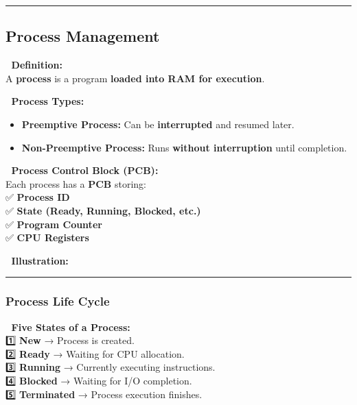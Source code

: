 \documentclass[
]{article}
\makeatletter
\newcommand*\pandocbounded[1]{%
  \sbox\pandoc@box{#1}%
  \Gscale@div\@tempa{\textheight}{\dimexpr\ht\pandoc@box+\dp\pandoc@box\relax}%
  \Gscale@div\@tempb{\linewidth}{\wd\pandoc@box}%
  \ifdim\@tempb\p@<\@tempa\p@\let\@tempa\@tempb\fi%
  \ifdim\@tempa\p@<\p@\scalebox{\@tempa}{\usebox\pandoc@box}%
  \else\usebox{\pandoc@box}%
  \fi%
}
\providecommand{\tightlist}{%
  \setlength{\itemsep}{0pt}\setlength{\parskip}{0pt}}
\makeatother
\begin{document}
\begin{center}\rule{0.5\linewidth}{0.5pt}\end{center}

\subsection{\texorpdfstring{\textbf{Process
Management}}{Process Management}}\label{process-management}

📌 \textbf{Definition:}\\
A \textbf{process} is a program \textbf{loaded into RAM for execution}.

📌 \textbf{Process Types:}

\begin{itemize}
\tightlist
\item
  \textbf{Preemptive Process:} Can be \textbf{interrupted} and resumed
  later.
\item
  \textbf{Non-Preemptive Process:} Runs \textbf{without interruption}
  until completion.
\end{itemize}

📌 \textbf{Process Control Block (PCB):}\\
Each process has a \textbf{PCB} storing:\\
✅ \textbf{Process ID}\\
✅ \textbf{State (Ready, Running, Blocked, etc.)}\\
✅ \textbf{Program Counter}\\
✅ \textbf{CPU Registers}

📌 \textbf{Illustration:}\\
\pandocbounded{\texttt{[image: Day\_2\_3.png]}}

\begin{center}\rule{0.5\linewidth}{0.5pt}\end{center}

\subsubsection{\texorpdfstring{\textbf{Process Life
Cycle}}{Process Life Cycle}}\label{process-life-cycle}

📌 \textbf{Five States of a Process:}\\
1️⃣ \textbf{New} → Process is created.\\
2️⃣ \textbf{Ready} → Waiting for CPU allocation.\\
3️⃣ \textbf{Running} → Currently executing instructions.\\
4️⃣ \textbf{Blocked} → Waiting for I/O completion.\\
5️⃣ \textbf{Terminated} → Process execution finishes.
\end{document}
